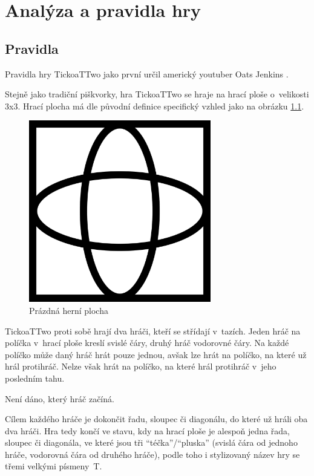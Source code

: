 \chapter{Analýza a pravidla hry}

\section{Pravidla}
Pravidla hry TickoaTTwo jako první určil americký youtuber Oats Jenkins \cite{jenkins22}.

Stejně jako tradiční piškvorky, hra TickoaTTwo se hraje na hrací ploše
o~velikosti 3x3. Hrací plocha má dle původní definice specifický vzhled jako
na obrázku \ref{fig:empty-board}.

\begin{figure}[h]
    \centering
    \includegraphics[width=300px]{img/empty-board.png}
    \caption[Prázdná herní plocha]{Prázdná herní plocha\footnotemark}
    \label{fig:empty-board}
\end{figure}


TickoaTTwo proti sobě hrají dva hráči, kteří se střídají v~tazích. Jeden hráč
na políčka v~hrací ploše kreslí svislé čáry, druhý hráč vodorovné čáry. Na
každé políčko může daný hráč hrát pouze jednou, avšak lze hrát na políčko, na
které už hrál protihráč. Nelze však hrát na políčko, na které hrál protihráč
v~jeho posledním tahu.

Není dáno, který hráč začíná.

Cílem každého hráče je dokončit řadu, sloupec či diagonálu, do které už hráli
oba dva hráči. Hra tedy končí ve stavu, kdy na hrací ploše je alespoň jedna
řada, sloupec či diagonála, ve které jsou tři \enquote{téčka}/\enquote{pluska}
(svislá čára od jednoho hráče, vodorovná čára od druhého hráče), podle toho i
stylizovaný název hry se třemi velkými písmeny~T.


